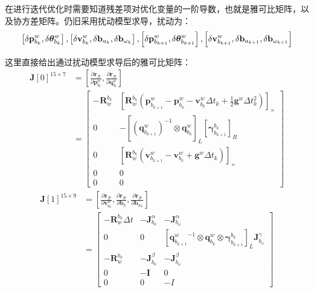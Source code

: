 在进行迭代优化时需要知道残差项对优化变量的一阶导数，也就是雅可比矩阵，以及协方差矩阵。仍旧采用扰动模型求导，扰动为：
\[
\setlength{\abovedisplayskip}{6pt}
\setlength{\belowdisplayskip}{6pt}
\left[\delta \mathbf{p}_{b_{k}}^{w},   \delta \bm{\theta}_{b_{k}}^{w}\right], 
\left[\delta \mathbf{v}_{b_{k}}^{w},   \delta \mathbf{b}_{a_{k}}, \delta \mathbf{b}_{\omega_{k}}\right], 
\left[\delta \mathbf{p}_{b_{k+1}}^{w}, \delta \bm{\theta}_{b_{k+1}}^{w}\right],
\left[\delta \mathbf{v}_{b_{k+1}}^{w}, \delta \mathbf{b}_{a_{k+1}}, \delta \mathbf{b}_{\omega_{k+1}}\right]
\]

这里直接给出通过扰动模型求导后的雅可比矩阵：
\begin{equation}
\label{eqn:4.10}
\begin{aligned}
\mathbf{J}[0]^{15 \times 7} &= \left[\frac{\partial \mathbf{r}_{\mathcal{B}}}{\partial \mathbf{p}_{b_{k}}^{w}}, \frac{\partial \mathbf{r}_{\mathcal{B}}}{\partial \mathbf{q}_{b_{k}}^{w}}\right] \\
&= \left[\begin{array}{cc}
-\mathbf{R}_{w}^{b_{k}} & \left[ \mathbf{R}_{w}^{b_{k}}\left(\mathbf{p}_{b_{k+1}}^{w} - \mathbf{p}_{b_{k}}^{w} - \mathbf{v}_{b_{k}}^{w} \Delta t_{k}+\frac{1}{2} \mathbf{g}^{w} \Delta t_{k}^{2}\right) \right]_\times \\ 
0                       & -{\left[ (\mathbf{q}_{b_{k+1}}^{w})^{-1} \otimes \mathbf{q}_{b_{k}}^{w}\right]}_L {\left[\bm{\gamma}_{b_{k+1}}^{b_{k}}\right]}_R \\
0                       & \left[ \mathbf{R}_{w}^{b_{k}}\left(\mathbf{v}_{b_{k+1}}^{w} - \mathbf{v}_{b_{k}}^{w} + \mathbf{g}^{w} \Delta t_{k}\right) \right]_\times \\
0                       & 0 \\
0                       & 0
\end{array}\right]
\end{aligned}
\end{equation}
\begin{equation}
\label{eqn:4.11}
\begin{aligned}
\mathbf{J}[1]^{15 \times 9} &= \left[\frac{\partial \mathbf{r}_{\mathcal{B}}}{\partial \mathbf{v}_{b_{k}}^{w}}, \frac{\partial \mathbf{r}_{\mathcal{B}}}{\partial \mathbf{b}_{k}}, \frac{\partial \mathbf{r}_{\mathcal{B}}}{\partial \mathbf{b}_{w_{k}}}\right] \\
&= \left[ \begin{array}{ccc}
{-\mathbf{R}_{w}^{b_{k}} \Delta t} & {-\mathbf{J}_{b_{a}}^{\alpha}} & {-\mathbf{J}_{b_{\omega}}^{\alpha}} \\ 
{0} & {0} & {\left[{\mathbf{q}_{b_{k+1}}^{w}}^{-1} \otimes \mathbf{q}_{b_{k}}^{w} \otimes \bm{\gamma}_{b_{k+1}}^{b_{k}}\right]_L \mathbf{J}_{b_{\omega}}^{\gamma}} \\ 
{-\mathbf{R}_{w}^{b_{k}}} & {-\mathbf{J}_{b_{a}}^{\beta}} & {-\mathbf{J}_{b_{\omega}}^{\beta}} \\ 
{0} & {-\mathbf{I}} & {0} \\ {0} & {0} & {\mathbf{-}I}\end{array}\right]
\end{aligned}
\end{equation}
